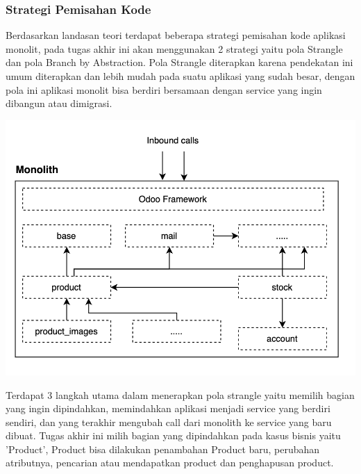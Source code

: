 \subsubsection{Strategi Pemisahan Kode}
Berdasarkan landasan teori terdapat beberapa strategi pemisahan kode aplikasi monolit, pada tugas akhir ini akan menggunakan 2 strategi yaitu pola Strangle dan pola Branch by Abstraction. Pola Strangle diterapkan karena pendekatan ini umum diterapkan dan lebih mudah pada suatu aplikasi yang sudah besar, dengan pola ini aplikasi monolit bisa berdiri bersamaan dengan service yang ingin dibangun atau dimigrasi. 
\begin{center}
	\includegraphics[width=14cm]{img/bab_3/strangelExMono.png}
	\label{fig:asd}
\end{center}

Terdapat 3 langkah utama dalam menerapkan pola strangle yaitu memilih bagian yang ingin dipindahkan, memindahkan aplikasi menjadi service yang berdiri sendiri, dan yang terakhir mengubah call dari monolith ke service yang baru dibuat. Tugas akhir ini milih bagian yang dipindahkan pada kasus bisnis yaitu 'Product', Product bisa dilakukan penambahan Product baru, perubahan atributnya, pencarian atau mendapatkan product dan penghapusan product.

